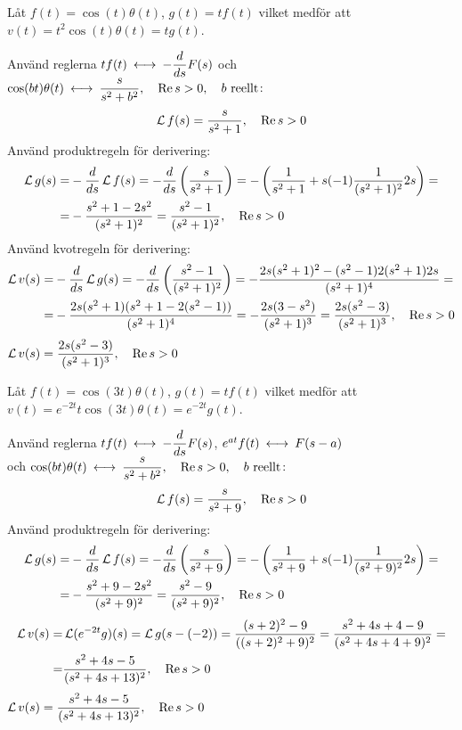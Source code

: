 \begin{task}{3.6}
	Låt $f(t)=\cos(t)\theta(t)$, $g(t)=tf(t)$ vilket medför att $v(t)=t^2\cos (t)\theta(t)=tg(t)$.
	
	Använd reglerna $tf(t) \llra -\dfrac{d}{ds}F(s)$ och $\cos(bt)\theta(t)\llra\dfrac{s}{s^2+b^2}\cond{\Re s > 0}\cond{b\text{ reellt}}$:
	\[\operatorname{\mathcal{L}} f(s)=\frac{s}{s^2+1}, \quad \operatorname{Re} s > 0\]
	Använd produktregeln för derivering:
	\begin{align*}
	\laplace g(s)=
	&-\frac{d}{ds}\laplace f(s)=
	-\frac{d}{ds}\left(\frac{s}{s^2+1}\right)=
	-\left(\frac{1}{s^2+1}+s\*(-1)\*\frac{1}{(s^2+1)^2}\*2s\right)= \\ =
	&-\frac{s^2+1-2s^2}{(s^2+1)^2}=
	\frac{s^2-1}{(s^2+1)^2}\cond{\Re s > 0}
	\end{align*}
	Använd kvotregeln för derivering:
	\begin{align*}
	\operatorname{\mathcal{L}} v(s)=
	&-\frac{d}{ds}\operatorname{\mathcal{L}} g(s)=
	-\frac{d}{ds}\left(\frac{s^2-1}{(s^2+1)^2}\right)=
	-\frac{2s(s^2+1)^2-(s^2-1)2(s^2+1)2s}{(s^2+1)^4}= \\ =
	&-\frac{2s(s^2+1)(s^2+1-2(s^2-1))}{(s^2+1)^4}=
	-\frac{2s(3-s^2)}{(s^2+1)^3}=
	\frac{2s(s^2-3)}{(s^2+1)^3}, \quad \operatorname{Re} s > 0
	\end{align*}
	\ans $\operatorname{\mathcal{L}} v(s)=\dfrac{2s(s^2-3)}{(s^2+1)^3}, \quad \operatorname{Re} s > 0$
\end{task}

\pagebreak
\begin{task}{3.7}
	Låt $f(t)=\cos(3t)\theta(t)$, $g(t)=tf(t)$ vilket medför att $v(t)=e^{-2t}t\cos(3t)\theta(t)=e^{-2t}g(t)$.
	
	Använd reglerna $tf(t) \llra -\dfrac{d}{ds}F(s)$, $e^{at}f(t)\llra F(s-a)$ \\
	och $\cos(bt)\theta(t)\llra\dfrac{s}{s^2+b^2}\cond{\Re s > 0}\cond{b\text{ reellt}}$:
	\[\operatorname{\mathcal{L}} f(s)=\frac{s}{s^2+9}, \quad \operatorname{Re} s > 0\]
	Använd produktregeln för derivering:
	\begin{align*}
	\laplace g(s)=
	&-\frac{d}{ds}\laplace f(s)=
	-\frac{d}{ds}\left(\frac{s}{s^2+9}\right)=
	-\left(\frac{1}{s^2+9}+s\*(-1)\*\frac{1}{(s^2+9)^2}\*2s\right)= \\ =
	&-\frac{s^2+9-2s^2}{(s^2+9)^2}=
	\frac{s^2-9}{(s^2+9)^2}\cond{\Re s > 0}
	\end{align*}
	\begin{align*}
	\operatorname{\mathcal{L}} v(s)=
	&\operatorname{\mathcal{L}} (e^{-2t}g)(s)=
	\operatorname{\mathcal{L}} g(s-(-2))=
	\frac{(s+2)^2-9}{((s+2)^2+9)^2}=
	\frac{s^2+4s+4-9}{(s^2+4s+4+9)^2}= \\ =
	&\frac{s^2+4s-5}{(s^2+4s+13)^2}, \quad \operatorname{Re} s > 0
	\end{align*}
	\ans $\operatorname{\mathcal{L}} v(s)=\dfrac{s^2+4s-5}{(s^2+4s+13)^2}, \quad \operatorname{Re} s > 0$
\end{task}

